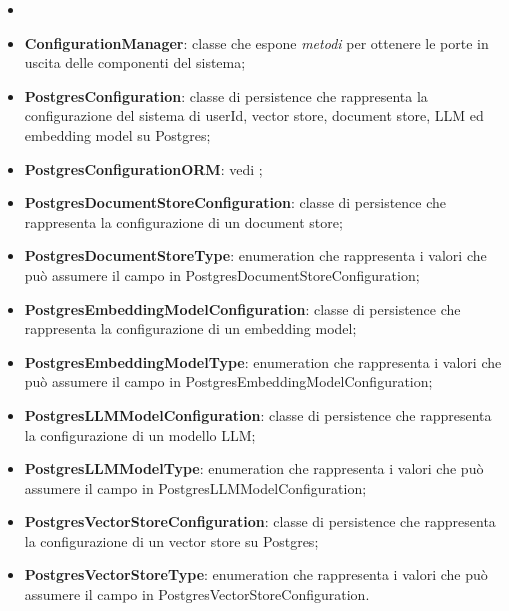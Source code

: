 \documentclass[10pt, a4paper]{article}
\begin{document}
\begin{itemize}
        \item 
       
\end{itemize}
\begin{itemize}
    \item \label{ConfigurationManager}\textbf{ConfigurationManager}: classe che espone \textit{metodi\pg} per ottenere le porte in uscita delle componenti del sistema;
    \item \label{PostgresConfiguration}\textbf{PostgresConfiguration}: classe di persistence che rappresenta la configurazione del sistema di userId, vector store, document store, LLM ed embedding model su Postgres;
    \item \textbf{PostgresConfigurationORM}: vedi ;
    \item \label{PostgresDocumentStoreConfiguration}\textbf{PostgresDocumentStoreConfiguration}: classe di persistence che rappresenta la configurazione di un document store;
    \item \label{PostgresDocumentStoreType}\textbf{PostgresDocumentStoreType}: enumeration che rappresenta i valori che può assumere il campo  in PostgresDocumentStoreConfiguration;

    \item \label{PostgresEmbeddingModelConfiguration}\textbf{PostgresEmbeddingModelConfiguration}: classe di persistence che rappresenta la configurazione di un embedding model;
    \item \label{PostgresEmbeddingModelType}\textbf{PostgresEmbeddingModelType}: enumeration che rappresenta i valori che può assumere il campo  in PostgresEmbeddingModelConfiguration;
    \item \label{PostgresLLMModelConfiguration}\textbf{PostgresLLMModelConfiguration}: classe di persistence che rappresenta la configurazione di un modello LLM;
    \item \label{PostgresLLMModelType}\textbf{PostgresLLMModelType}: enumeration che rappresenta i valori che può assumere il campo  in PostgresLLMModelConfiguration;

    \item \label{PostgresVectorStoreConfiguration}\textbf{PostgresVectorStoreConfiguration}: classe di persistence che rappresenta la configurazione di un vector store su Postgres;
    \item \label{PostgresVectorStoreType}\textbf{PostgresVectorStoreType}: enumeration che rappresenta i valori che può assumere il campo  in PostgresVectorStoreConfiguration.
   
    
\end{itemize}
\end{document}
